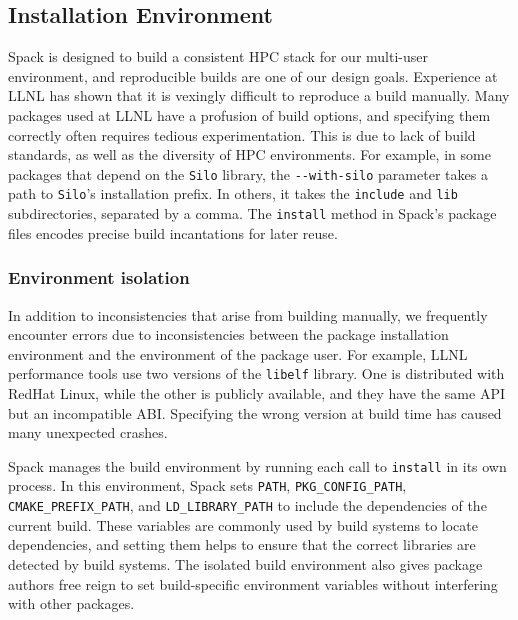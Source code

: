 
\subsection{Installation Environment}

Spack is designed to build a consistent HPC stack for our multi-user
environment, and reproducible builds are one of our design goals.
Experience at LLNL has shown that it is vexingly difficult to reproduce
a build manually.
%
Many packages used at LLNL have a profusion of build options, and specifying
them correctly often requires tedious experimentation.  This is due to lack of
build standards, as well as the diversity of HPC environments.
For example, in some packages that depend on the {\tt Silo} library,
the \verb|--with-silo| parameter takes a path to {\tt Silo}'s installation prefix.
In others, it takes the {\tt include} and {\tt lib} subdirectories,
separated by a comma.
The {\tt install} method in Spack's package files encodes precise build
incantations for later reuse.

\subsubsection{Environment isolation}
In addition to inconsistencies that arise from building manually, we
frequently encounter errors due to inconsistencies between the package
installation environment and the environment of the package user.
%
For example, LLNL performance tools use two versions of the {\tt libelf}
library. One is distributed with RedHat Linux, while the
other is publicly available, and they have the same API but an incompatible ABI.
Specifying the wrong version at build time has caused many
unexpected crashes.

Spack manages the build environment by running each call to {\tt install}
in its own process.  In this environment, Spack sets
{\tt PATH}, {\tt PKG\_CONFIG\_PATH}, {\tt CMAKE\_PREFIX\_PATH}, and
{\tt LD\_LIBRARY\_PATH} to include the dependencies of the current build.
These variables are commonly used by build systems to locate dependencies,
and setting them helps to ensure that the correct libraries are detected by
build systems.
The isolated build environment also gives package authors 
free reign to set build-specific environment variables without interfering
with other packages.


